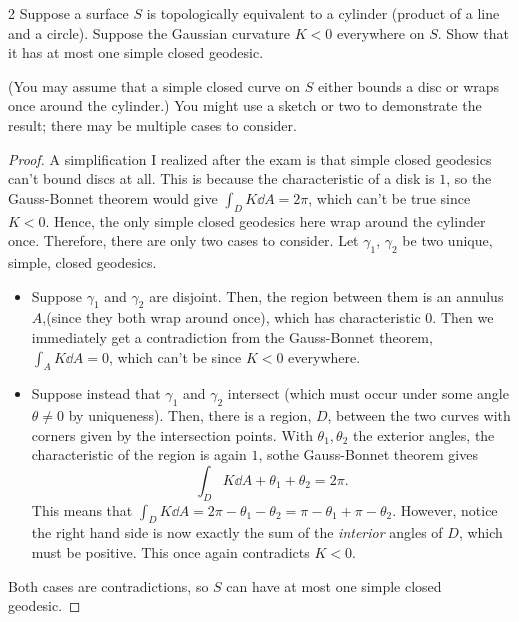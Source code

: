 \documentclass[11pt]{article}
\begin{document}
\begin{problem}{2}
  Suppose a surface \( S \) is topologically equivalent to a cylinder (product of a line and a circle).
  Suppose the Gaussian curvature \( K < 0 \) everywhere on \( S \).
  Show that it has at most one simple closed geodesic.

  (You may assume that a simple closed curve on \( S \) either bounds a disc or wraps once around the cylinder.)
  You might use a sketch or two to demonstrate the result; there may be multiple cases to consider.
\end{problem}
\begin{proof}
  A simplification I realized after the exam is that simple closed geodesics can't bound discs at all.
  This is because the characteristic of a disk is \( 1 \), so the Gauss-Bonnet theorem would give \( \int_{D} K \dd{A} = 2\pi \), which can't be true since \( K < 0 \).
  Hence, the only simple closed geodesics here wrap around the cylinder once.
  Therefore, there are only two cases to consider.
  Let \(\gamma_1\), \(\gamma_2\) be two unique, simple, closed geodesics.
  \begin{itemize}
    \item Suppose \( \gamma_1 \) and \(\gamma_2\) are disjoint.
          Then, the region between them is an annulus \( A \),(since they both wrap around once), which has characteristic \( 0 \).
          Then we immediately get a contradiction from the Gauss-Bonnet theorem, \( \int_{A} K \dd{A} = 0\), which can't be since \( K < 0 \) everywhere.
    \item Suppose instead that \(\gamma_1\) and \(\gamma_2\) intersect (which must occur under some angle \(\theta \neq 0\) by uniqueness).
          Then, there is a region, \( D \), between the two curves with corners given by the intersection points.
          With \(\theta_1, \theta_2\) the exterior angles, the characteristic of the region is again \( 1 \), sothe Gauss-Bonnet theorem gives
          \begin{equation}
          \label{eq:7}
          \int_D K \dd{A} + \theta_1 + \theta_2 = 2\pi.
        \end{equation}
          This means that \( \int_D K \dd{A} = 2\pi - \theta_1 - \theta_{2} = \pi - \theta_1 + \pi - \theta_2\).
          However, notice the right hand side is now exactly the sum of the \textit{interior} angles of \( D \), which must be positive.
          This once again contradicts \( K < 0 \).
  \end{itemize}
  Both cases are contradictions, so \( S \) can have at most one simple closed geodesic.
\end{proof}
\end{document}
